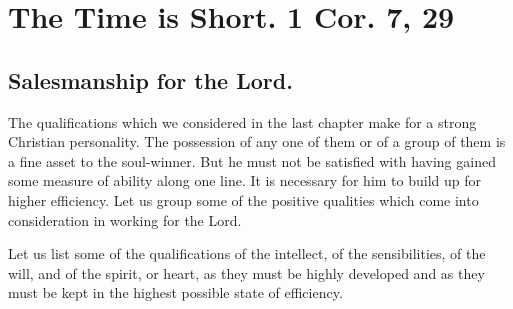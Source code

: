 \documentclass[
]{book}
\begin{document}
\hypertarget{the-time-is-short.-1-cor.-7-29}{%
\chapter{The Time is Short. 1 Cor. 7, 29}\label{the-time-is-short.-1-cor.-7-29}}

\hypertarget{salesmanship-for-the-lord.}{%
\section*{Salesmanship for the Lord.}\label{salesmanship-for-the-lord.}}

The qualifications which we considered in the last chapter make for a strong Christian personality. The possession of any one of them or of a group of them is a fine asset to the soul-winner. But he must not be satisfied with having gained some measure of ability along one line. It is necessary for him to build up for higher efficiency. Let us group some of the positive qualities which come into consideration in working for the Lord.

Let us list some of the qualifications of the intellect, of the sensibilities, of the will, and of the spirit, or heart, as they must be highly developed and as they must be kept in the highest possible state of efficiency.
\end{document}

